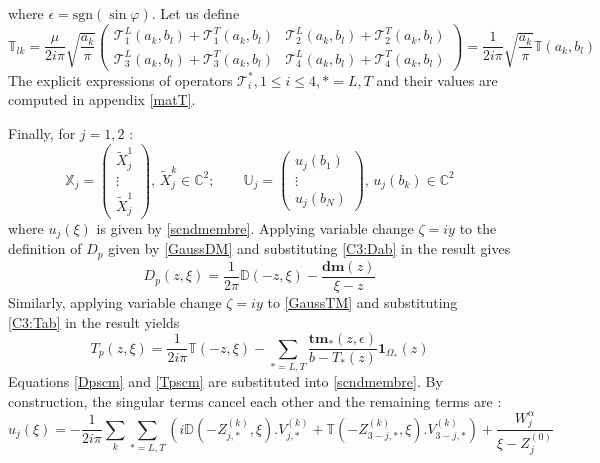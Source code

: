 where $\epsilon= \mbox{sgn}( \sin \varphi)$. Let us define
\begin{equation}
\mathbb{T}_{lk}=\frac{\mu}{2i\pi}\sqrt{\frac{a_k}{\pi}}
\begin{pmatrix}
\mathcal{T}_1^L(a_k,b_l)+ \mathcal{T}_1^T(a_k,b_l)  &  \mathcal{T}_2^L(a_k,b_l) + \mathcal{T}_2^T(a_k,b_l)  \\
 \mathcal{T}_3^L(a_k,b_l)+ \mathcal{T}_3^T(a_k,b_l) &\mathcal{T}_4^L(a_k,b_l)+ \mathcal{T}_4^T(a_k,b_l)
\end{pmatrix}
=\frac{1}{2i\pi}\sqrt{\frac{a_k}{\pi}}\mathbb{T}(a_k,b_l)
\label{C3:Tab}
\end{equation}
The explicit expressions of operators $\mathcal{T}_i^*, 1\leq i\leq4, *=L,T$ and their values are computed in appendix \ref{matT}.

Finally, for $j=1,2$ :
\begin{equation}
\mathbb{X}_j=\begin{pmatrix}
\tilde{X}^1_j \\
\vdots \\
\tilde{X}^1_j
\end{pmatrix}, \,
\tilde{X}^k_j \in \mathbb{C}^2; \hspace{2em}
\mathbb{U}_j=\begin{pmatrix}
u_j(b_1)\\
\vdots \\
u_j(b_N)
\end{pmatrix}, \,
u_j(b_k) \in \mathbb{C}^2
\end{equation}
where $u_j(\xi)$ is given by \eqref{scndmembre}. Applying variable change $\zeta=iy$ to the definition of $D_p$ given by 
\eqref{GaussDM} and substituting \eqref{C3:Dab} in the result gives
\begin{equation}
D_p(z,\xi)=\frac{1}{2\pi}\mathbb{D}(-z,\xi)-\frac{\textbf{dm}(z)}{\xi-z}
\label{Dpscm}
\end{equation}
Similarly, applying variable change $\zeta=iy$ to \eqref{GaussTM} and substituting \eqref{C3:Tab} in the result yields
\begin{equation}
T_p(z,\xi)=\frac{1}{2i\pi}\mathbb{T}(-z,\xi)- \sum_{*=L,T}\frac{\textbf{tm}_*(z,\epsilon)}{b-T_*(z)}\textbf{1}_{\Omega_*}(z)
\label{Tpscm}
\end{equation}
Equations \eqref{Dpscm} and \eqref{Tpscm} are substituted into \eqref{scndmembre}. By construction, the singular terms cancel each other and the remaining terms are :
\begin{equation}
u_j(\xi)=-\frac{1}{2i\pi}\sum_{k}\sum_{*=L,T}\left(i\mathbb{D}(-Z_{j,*}^{(k)},\xi).V_{j,*}^{(k)}+\mathbb{T}(-Z_{3-j,*}^{(k)},\xi).V_{3-j,*}^{(k)} \right) +\frac{W_j^{\alpha}}{\xi-Z_j^{(0)}}
\label{uDT}
\end{equation}


